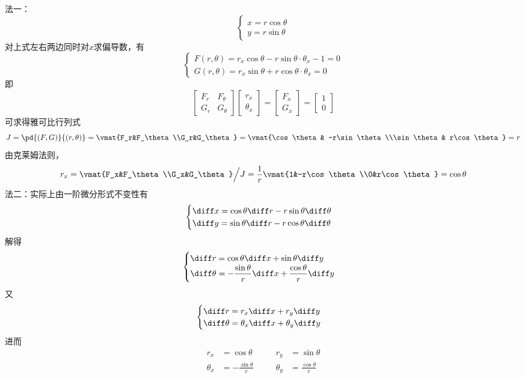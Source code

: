 \begin{analysis}
法一：
\[\begin{cases}
x=r\cos\theta\\
y=r\sin\theta
\end{cases}\]
对上式左右两边同时对$x$求偏导数，有
\[\begin{cases}
F(r,\theta)=r_x\cos\theta-r\sin\theta\cdot\theta_x-1=0\\
G(r,\theta)=r_x\sin\theta+r\cos\theta\cdot\theta_x=0
\end{cases}\]
即
\[\begin{bmatrix}F_r&F_\theta\\G_r&G_\theta\end{bmatrix}
\begin{bmatrix}r_x\\\theta_x\end{bmatrix}
=\begin{bmatrix}F_x\\G_x\end{bmatrix}
=\begin{bmatrix}1\\0\end{bmatrix}\]
可求得雅可比行列式
\[J=\pd{(F,G)}{(r,\theta)}=\vmat{F_r&F_\theta\\G_r&G_\theta}
=\vmat{\cos\theta & -r\sin\theta\\\sin\theta & r\cos\theta}=r\]
由克莱姆法则，
\[r_x=\vmat{F_x&F_\theta\\G_x&G_\theta}\Big/J=\dfrac{1}{r}\vmat{1&-r\cos\theta\\0&r\cos\theta}=\cos\theta\]
法二：实际上由一阶微分形式不变性有
\[\begin{cases}
\diff x=\cos\theta \diff r-r\sin\theta\diff\theta\\
\diff y=\sin\theta \diff r-r\cos\theta\diff\theta
\end{cases}\]
解得
\[\begin{cases}
\diff r=\cos\theta\diff x+\sin\theta\diff y\\
\diff\theta=-\dfrac{\sin\theta}{r}\diff x+\dfrac{\cos\theta}{r}\diff y
\end{cases}\]
又
\[\begin{cases}
\diff r = r_x\diff x+r_y\diff y\\
\diff \theta=\theta_x\diff x+\theta_y\diff y
\end{cases}\]
进而
\[\begin{aligned}
r_x&=\cos\theta\qquad&r_y&=\sin\theta\\
\theta_x&=-\frac{\sin\theta}{r}&\theta_y&=\frac{\cos\theta}{r}
\end{aligned}\]
\end{analysis}

